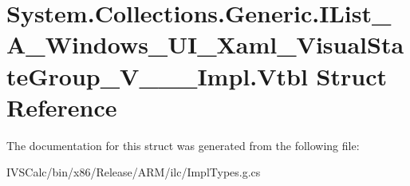 \hypertarget{struct_system_1_1_collections_1_1_generic_1_1_i_list___a___windows___u_i___xaml___visual_state_group___v_______impl_1_1_vtbl}{}\section{System.\+Collections.\+Generic.\+I\+List\+\_\+\+A\+\_\+\+Windows\+\_\+\+U\+I\+\_\+\+Xaml\+\_\+\+Visual\+State\+Group\+\_\+\+V\+\_\+\+\_\+\+\_\+\+Impl.\+Vtbl Struct Reference}
\label{struct_system_1_1_collections_1_1_generic_1_1_i_list___a___windows___u_i___xaml___visual_state_group___v_______impl_1_1_vtbl}


The documentation for this struct was generated from the following file\+:\begin{DoxyCompactItemize}
\item 
I\+V\+S\+Calc/bin/x86/\+Release/\+A\+R\+M/ilc/Impl\+Types.\+g.\+cs\end{DoxyCompactItemize}
